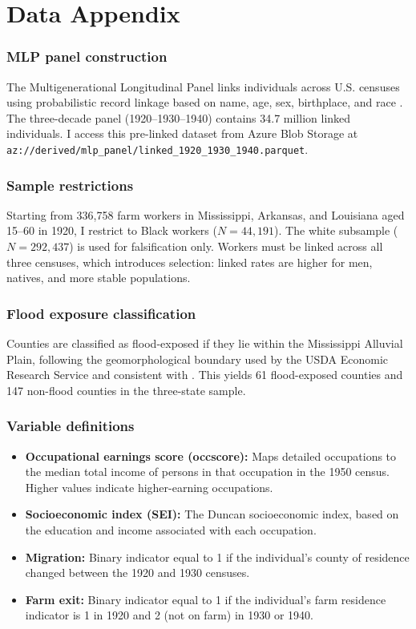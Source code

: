 \documentclass[12pt]{article}
\begin{document}
\newpage
\appendix

\section{Data Appendix}

\subsubsection*{MLP panel construction} The Multigenerational Longitudinal Panel links individuals across U.S. censuses using probabilistic record linkage based on name, age, sex, birthplace, and race \citep{abramitzky_etal_2021}. The three-decade panel (1920--1930--1940) contains 34.7 million linked individuals. I access this pre-linked dataset from Azure Blob Storage at \texttt{az://derived/mlp\_panel/linked\_1920\_1930\_1940.parquet}.

\subsubsection*{Sample restrictions} Starting from 336,758 farm workers in Mississippi, Arkansas, and Louisiana aged 15--60 in 1920, I restrict to Black workers ($N = 44{,}191$). The white subsample ($N = 292{,}437$) is used for falsification only. Workers must be linked across all three censuses, which introduces selection: linked rates are higher for men, natives, and more stable populations.

\subsubsection*{Flood exposure classification} Counties are classified as flood-exposed if they lie within the Mississippi Alluvial Plain, following the geomorphological boundary used by the USDA Economic Research Service and consistent with \citet{hornbeck_naidu_2014}. This yields 61 flood-exposed counties and 147 non-flood counties in the three-state sample.

\subsubsection*{Variable definitions}
\begin{itemize}
  \item \textbf{Occupational earnings score (occscore):} Maps detailed occupations to the median total income of persons in that occupation in the 1950 census. Higher values indicate higher-earning occupations.
  \item \textbf{Socioeconomic index (SEI):} The Duncan socioeconomic index, based on the education and income associated with each occupation.
  \item \textbf{Migration:} Binary indicator equal to 1 if the individual's county of residence changed between the 1920 and 1930 censuses.
  \item \textbf{Farm exit:} Binary indicator equal to 1 if the individual's farm residence indicator is 1 in 1920 and 2 (not on farm) in 1930 or 1940.
\end{itemize}
\end{document}
